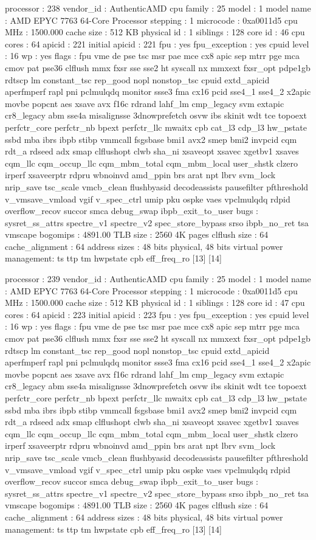 processor	: 238
vendor_id	: AuthenticAMD
cpu family	: 25
model		: 1
model name	: AMD EPYC 7763 64-Core Processor
stepping	: 1
microcode	: 0xa0011d5
cpu MHz		: 1500.000
cache size	: 512 KB
physical id	: 1
siblings	: 128
core id		: 46
cpu cores	: 64
apicid		: 221
initial apicid	: 221
fpu		: yes
fpu_exception	: yes
cpuid level	: 16
wp		: yes
flags		: fpu vme de pse tsc msr pae mce cx8 apic sep mtrr pge mca cmov pat pse36 clflush mmx fxsr sse sse2 ht syscall nx mmxext fxsr_opt pdpe1gb rdtscp lm constant_tsc rep_good nopl nonstop_tsc cpuid extd_apicid aperfmperf rapl pni pclmulqdq monitor ssse3 fma cx16 pcid sse4_1 sse4_2 x2apic movbe popcnt aes xsave avx f16c rdrand lahf_lm cmp_legacy svm extapic cr8_legacy abm sse4a misalignsse 3dnowprefetch osvw ibs skinit wdt tce topoext perfctr_core perfctr_nb bpext perfctr_llc mwaitx cpb cat_l3 cdp_l3 hw_pstate ssbd mba ibrs ibpb stibp vmmcall fsgsbase bmi1 avx2 smep bmi2 invpcid cqm rdt_a rdseed adx smap clflushopt clwb sha_ni xsaveopt xsavec xgetbv1 xsaves cqm_llc cqm_occup_llc cqm_mbm_total cqm_mbm_local user_shstk clzero irperf xsaveerptr rdpru wbnoinvd amd_ppin brs arat npt lbrv svm_lock nrip_save tsc_scale vmcb_clean flushbyasid decodeassists pausefilter pfthreshold v_vmsave_vmload vgif v_spec_ctrl umip pku ospke vaes vpclmulqdq rdpid overflow_recov succor smca debug_swap ibpb_exit_to_user
bugs		: sysret_ss_attrs spectre_v1 spectre_v2 spec_store_bypass srso ibpb_no_ret tsa vmscape
bogomips	: 4891.00
TLB size	: 2560 4K pages
clflush size	: 64
cache_alignment	: 64
address sizes	: 48 bits physical, 48 bits virtual
power management: ts ttp tm hwpstate cpb eff_freq_ro [13] [14]

processor	: 239
vendor_id	: AuthenticAMD
cpu family	: 25
model		: 1
model name	: AMD EPYC 7763 64-Core Processor
stepping	: 1
microcode	: 0xa0011d5
cpu MHz		: 1500.000
cache size	: 512 KB
physical id	: 1
siblings	: 128
core id		: 47
cpu cores	: 64
apicid		: 223
initial apicid	: 223
fpu		: yes
fpu_exception	: yes
cpuid level	: 16
wp		: yes
flags		: fpu vme de pse tsc msr pae mce cx8 apic sep mtrr pge mca cmov pat pse36 clflush mmx fxsr sse sse2 ht syscall nx mmxext fxsr_opt pdpe1gb rdtscp lm constant_tsc rep_good nopl nonstop_tsc cpuid extd_apicid aperfmperf rapl pni pclmulqdq monitor ssse3 fma cx16 pcid sse4_1 sse4_2 x2apic movbe popcnt aes xsave avx f16c rdrand lahf_lm cmp_legacy svm extapic cr8_legacy abm sse4a misalignsse 3dnowprefetch osvw ibs skinit wdt tce topoext perfctr_core perfctr_nb bpext perfctr_llc mwaitx cpb cat_l3 cdp_l3 hw_pstate ssbd mba ibrs ibpb stibp vmmcall fsgsbase bmi1 avx2 smep bmi2 invpcid cqm rdt_a rdseed adx smap clflushopt clwb sha_ni xsaveopt xsavec xgetbv1 xsaves cqm_llc cqm_occup_llc cqm_mbm_total cqm_mbm_local user_shstk clzero irperf xsaveerptr rdpru wbnoinvd amd_ppin brs arat npt lbrv svm_lock nrip_save tsc_scale vmcb_clean flushbyasid decodeassists pausefilter pfthreshold v_vmsave_vmload vgif v_spec_ctrl umip pku ospke vaes vpclmulqdq rdpid overflow_recov succor smca debug_swap ibpb_exit_to_user
bugs		: sysret_ss_attrs spectre_v1 spectre_v2 spec_store_bypass srso ibpb_no_ret tsa vmscape
bogomips	: 4891.00
TLB size	: 2560 4K pages
clflush size	: 64
cache_alignment	: 64
address sizes	: 48 bits physical, 48 bits virtual
power management: ts ttp tm hwpstate cpb eff_freq_ro [13] [14]

